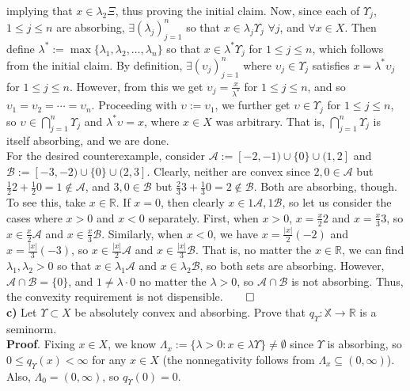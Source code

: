 \documentclass[10pt]{article}
\newcommand{\mbb}[1]{\mathbb{#1}}
\newcommand{\1}[1]{\mathbbm{1}_{#1}}
\newcommand{\mc}[1]{\mathcal{#1}}
\begin{document}
    implying that $x\in\lambda_2\Xi$, thus proving the initial claim. Now, since
    each of $\Upsilon_j$, $1\leq j\leq n$ are absorbing, $\exists
    (\lambda_j)_{j=1}^n$ so that $x\in\lambda_j\Upsilon_j$ $\forall j$, and
    $\forall x\in X$. Then define
    $\lambda^\ast:=\max\{\lambda_1,\lambda_2,\dots,\lambda_n\}$ so that
    $x\in\lambda^\ast\Upsilon_j$ for $1\leq j\leq n$, which follows from the
    initial claim. By definition, $\exists(\upsilon_j)_{j=1}^n$ where
    $\upsilon_j\in\Upsilon_j$ satisfies $x=\lambda^\ast\upsilon_j$ for $1\leq
    j\leq n$. However, from this we get $\upsilon_j=\tfrac{x}{\lambda^\ast}$ for
    $1\leq j\leq n$, and so $\upsilon_1=\upsilon_2=\cdots=\upsilon_n$.
    Proceeding with $\upsilon:=\upsilon_1$, we further get
    $\upsilon\in\Upsilon_j$ for $1\leq j\leq n$, so
    $\upsilon\in\bigcap_{j=1}^n\Upsilon_j$ and $\lambda^\ast\upsilon=x$, where
    $x\in X$ was arbitrary. That is, $\bigcap_{j=1}^n\Upsilon_j$ is itself
    absorbing, and we are done.\\[5pt]
    For the desired counterexample, consider $\mc{A}:=[-2,-1)\cup\{0\}\cup(1,2]$
    and $\mc{B}:=[-3,-2)\cup\{0\}\cup(2,3]$. Clearly, neither are convex since
    $2,0\in\mc{A}$ but $\tfrac{1}{2}2+\tfrac{1}{2}0=1\notin\mc{A}$, and
    $3,0\in\mc{B}$ but $\tfrac{2}{3}3+\tfrac{1}{3}0=2\notin\mc{B}$. Both are
    absorbing, though. To see this, take $x\in\mbb{R}$. If $x=0$, then clearly
    $x\in 1\mc{A},1\mc{B}$, so let us consider the cases where $x>0$ and $x<0$
    separately. First, when $x>0$, $x=\tfrac{x}{2}2$ and $x=\tfrac{x}{3}3$, so
    $x\in\tfrac{x}{2}\mc{A}$ and $x\in\tfrac{x}{3}\mc{B}$. Similarly, when
    $x<0$, we have $x=\tfrac{|x|}{2}(-2)$ and $x=\tfrac{|x|}{3}(-3)$, so
    $x\in\tfrac{|x|}{2}\mc{A}$ and $x\in\tfrac{|x|}{3}\mc{B}$. That is, no matter the $x\in\mbb{R}$, we
    can find $\lambda_1,\lambda_2>0$ so that $x\in\lambda_1\mc{A}$ and $x\in\lambda_2\mc{B}$, so both sets are absorbing.
    However, $\mc{A}\cap\mc{B}=\{0\}$, and $1\neq\lambda\cdot 0$ no matter the $\lambda>0$, so $\mc{A}\cap\mc{B}$ is not absorbing.
    Thus, the convexity requirement is not dispensible.\hfill{$\qed$}\\[5pt]
    {\bf c)} Let $\Upsilon\subset X$ be absolutely convex and absorbing. Prove that $q_\Upsilon:\mbb{X}\rightarrow\mbb{R}$ is a seminorm.\\[5pt]
    {\bf Proof}. Fixing $x\in X$, we know $\Lambda_x:=\{\lambda>0:x\in\lambda\Upsilon\}\neq\emptyset$ since $\Upsilon$ is absorbing, so $0\leq q_\Upsilon(x)<\infty$ for any $x\in X$
    (the nonnegativity follows from $\Lambda_x\subseteq(0,\infty)$). Also, $\Lambda_0=(0,\infty)$, so $q_\Upsilon(0)=0$.\\[5pt]
\end{document}
